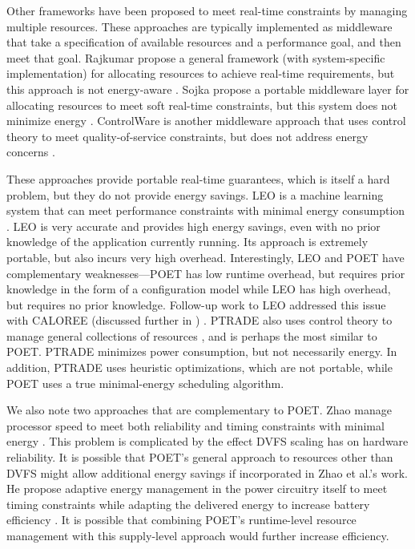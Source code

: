 Other frameworks have been proposed to meet real-time constraints by managing multiple resources.
These approaches are typically implemented as middleware that take a specification of available resources and a performance goal, and then meet that goal.
Rajkumar \etal propose a general framework (with system-specific implementation) for allocating resources to achieve real-time requirements, but this approach is not energy-aware \cite{Rajkumar}.
Sojka \etal propose a portable middleware layer for allocating resources to meet soft real-time constraints, but this system does not minimize energy \cite{Sojka}.
ControlWare is another middleware approach that uses control theory to meet quality-of-service constraints, but does not address energy concerns \cite{ControlWare}.

These approaches provide portable real-time guarantees, which is itself a hard problem, but they do not provide energy savings.
LEO is a machine learning system that can meet performance constraints with minimal energy consumption \cite{LEO}.
LEO is very accurate and provides high energy savings, even with no prior knowledge of the application currently running.
Its approach is extremely portable, but also incurs very high overhead.
Interestingly, LEO and POET have complementary weaknesses---POET has low runtime overhead, but requires prior knowledge in the form of a configuration model while LEO has high overhead, but requires no prior knowledge.
Follow-up work to LEO addressed this issue with CALOREE (discussed further in ) \cite{CALOREE}.
PTRADE also uses control theory to manage general collections of resources \cite{PTRADE}, and is perhaps the most similar to POET.
PTRADE minimizes power consumption, but not necessarily energy.
In addition, PTRADE uses heuristic optimizations, which are not portable, while POET uses a true minimal-energy scheduling algorithm.

We also note two approaches that are complementary to POET.
Zhao \etal manage processor speed to meet both reliability and timing constraints with minimal energy \cite{Zhao2012}.
This problem is complicated by the effect DVFS scaling has on hardware reliability.
It is possible that POET's general approach to resources other than DVFS might allow additional energy savings if incorporated in Zhao et al.'s work.
He \etal propose adaptive energy management in the power circuitry itself to meet timing constraints while adapting the delivered energy to increase battery efficiency \cite{He2013}.
It is possible that combining POET's runtime-level resource management with this supply-level approach would further increase efficiency.

